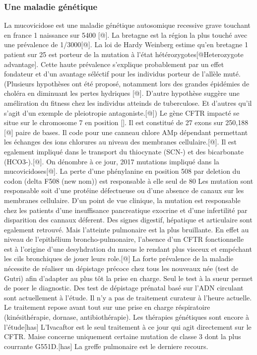 \documentclass[12pt,a4paper]{article}
\begin{document}
\subsubsection{Une maladie génétique}
La mucovicidose est une maladie génétique autosomique recessive grave touchant en france 1 naissance sur 5400 [@]. La bretagne est la région la plus touché avec une prévalence de 1/3000[@].
La loi de Hardy Weinberg estime qu’en bretagne 1 patient sur 25 est porteur de la mutation à l’état hétérozygotes[@Heterozygote advantage]. Cette haute prévalence s’explique probablement par un effet fondateur et d’un avantage séléctif pour les individus porteur de l’allèle muté. (Plusieurs hypothèses ont été proposé, notamment lors des grandes épidémies de choléra en diminuant les pertes hydriques [@]. D’autre hypothèse suggère une améliration du fitness chez les individus atteinds de tuberculose. Et d’autres qu’il s’agit d’un exemple de pleiotropie antagoniste.[@])
Le gène CFTR impacté se situe sur le chromosome 7 en position []. Il est constitué de 27 exons sur 250,188 [@] paire de bases. Il code pour une canneau chlore AMp dépendant permettant les échanges des ions chlorures au niveau des membranes cellulaire.[@]. Il est egalement impliqué dans le transport du thiocynate (SCN-) et des bicarbonate (HCO3-).[@].
On dénombre à ce jour, 2017 mutations impliqué dans la mucovicidoses[@]. La perte d’une phénylanine en position 508 par deletion du codon (delta F508 (new nom)) est responsable à elle seul de 80%
Les mutation sont responsable soit d’une protéine défectueuse ou d’une absence de canaux sur les membranes cellulaire.
D’un point de vue clinique, la mutation est responsable chez les patients d’une insuffisance pancreatique exocrine et d’une infertilité par disparition des cannaux déferent. Des signes digestif, hépatique et articulaire sont egalement retrouvé.
Mais l’atteinte pulmonaire est la plus bruillante. En effet au niveau de l’epithélium broncho-pulmonaire, l’absence d’un CFTR fonctionnelle est à l’origine d’une desyhdration du mucus le rendant plus visceux et empéchant les cils bronchiques de jouer leurs role.[@]
La forte prévalence de la maladie nécessite de réaliser un dépistage précoce chez tous les nouveaux née (test de Gutri) afin d’adapter au plus tôt la prise en charge. Seul le test à la sueur permet de poser le diagnostic. Des test de dépistage prénatal basé sur l’ADN circulant sont actuellement à l’étude.
Il n’y a pas de traitement curateur à l’heure actuelle. Le traitement repose avant tout sur une prise en charge réspiratoire (kinésithérapie, dornase, antibiothérapie).
Les thérapies génétiques sont encore à l’étude[has]
L’Ivacaftor est le seul traitement à ce jour qui agit directement sur le CFTR. Maise concerne uniquement certaine mutation de classe 3 dont la plus courrante G551D.[has]
La greffe pulmonaire est le derniere recours.
\end{document}

